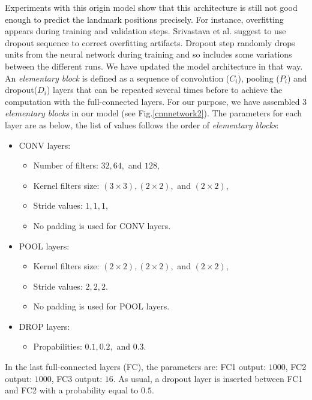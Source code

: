 \documentclass[10pt]{article}
\begin{document}
Experiments with this origin model show that this architecture is still
not good enough to predict the landmark positions precisely. For
instance, overfitting appears during training and validation
steps. Srivastava et al. \cite{srivastava2014dropout} suggest to use
dropout sequence to correct overfitting artifacts. Dropout step randomly drops units from the
neural network during training and so includes some variations between
the different runs. We have updated the model architecture in that
way. An \textit{elementary block} is defined as a sequence of
convolution (\textit{$C_i$}), pooling (\textit{$P_i$}) and dropout(\textit{$D_i$}) layers that can be repeated several
times before to achieve the computation with the full-connected
layers. For our purpose, we have assembled $3$ \textit{elementary
  blocks} in our model (see Fig.\ref{cnnnetwork2}). The parameters for
each layer are as below, the list of values follows the order of
\textit{elementary blocks}:

\begin{itemize}[nosep,label=\footnotesize$\bullet$]

\item CONV layers:
		\begin{itemize}[nosep]
			\item Number of filters: $32, 64,$ and $128$,
			\item Kernel filters size: $(3 \times 3), (2 \times 2),$ and $(2 \times 2)$,
			\item Stride values: $1, 1, 1$,
			\item No padding is used for CONV layers.
		\end{itemize}			
	\item POOL layers:
		\begin{itemize}[nosep]
			\item Kernel filters size: $(2 \times 2), (2 \times 2),$ and $(2 \times 2)$,
			\item Stride values: $2, 2, 2$.
			\item No padding is used for POOL layers.
		\end{itemize}
	\item DROP layers: 
		\begin{itemize}[nosep]
			\item Propabilities: $0.1, 0.2, $ and $0.3$.
		\end{itemize}
	\end{itemize}
In the last full-connected layers (FC), the parameters are: FC1 output:
$1000$, FC2 output: $1000$, FC3  output: $16$. As usual, a dropout layer is
inserted between FC1 and FC2 with a probability equal to $0.5$.
\end{document}
